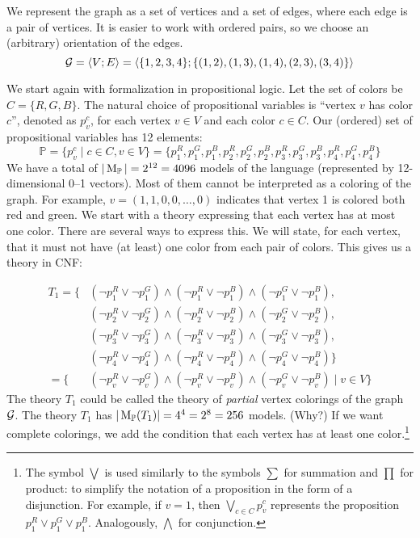 We represent the graph as a set of vertices and a set of edges, where each edge is a pair of vertices. It is easier to work with ordered pairs, so we choose an (arbitrary) orientation of the edges.
\[
\mathcal{G} = \langle V; E \rangle = \langle \{1,2,3,4\}; \{(1,2),(1,3),(1,4),(2,3),(3,4)\} \rangle
\]

We start again with formalization in propositional logic. Let the set of colors be \( C = \{R, G, B\} \). The natural choice of propositional variables is ``vertex \( v \) has color \( c \)'', denoted as \( p_v^c \), for each vertex \( v \in V \) and each color \( c \in C \). Our (ordered) set of propositional variables has 12 elements:
\[
\mathbb{P} = \{p_v^c \mid c \in C, v \in V\} = \{p_1^R, p_1^G, p_1^B, p_2^R, p_2^G, p_2^B, p_3^R, p_3^G, p_3^B, p_4^R, p_4^G, p_4^B\}
\]
We have a total of \( |\operatorname{M}_\mathbb{P}| = 2^{12} = 4096 \) models of the language (represented by 12-dimensional 0--1 vectors). Most of them cannot be interpreted as a coloring of the graph. For example, \( v = (1,1,0,0,\dots,0) \) indicates that vertex 1 is colored both red and green. We start with a theory expressing that each vertex has at most one color. There are several ways to express this. We will state, for each vertex, that it must not have (at least) one color from each pair of colors. This gives us a theory in {CNF}:

\begin{align*}
T_1 = \{ 
&(\neg p_1^R \lor \neg p_1^G) \land (\neg p_1^R \lor \neg p_1^B) \land (\neg p_1^G \lor \neg p_1^B),\\
&(\neg p_2^R \lor \neg p_2^G) \land (\neg p_2^R \lor \neg p_2^B) \land (\neg p_2^G \lor \neg p_2^B),\\
&(\neg p_3^R \lor \neg p_3^G) \land (\neg p_3^R \lor \neg p_3^B) \land (\neg p_3^G \lor \neg p_3^B),\\
&(\neg p_4^R \lor \neg p_4^G) \land (\neg p_4^R \lor \neg p_4^B) \land (\neg p_4^G \lor \neg p_4^B)\} \\
    = \{ &(\neg p_v^R \lor \neg p_v^G) \land (\neg p_v^R \lor \neg p_v^B) \land (\neg p_v^G \lor \neg p_v^B) \mid v \in V \} 
\end{align*}
The theory \(T_1\) could be called the theory of \emph{partial} vertex colorings of the graph \(\mathcal{G}\). The theory \(T_1\) has \(|\operatorname{M}_\mathbb{P}(T_1)| = 4^4 = 2^8 = 256\) models. (Why?) If we want complete colorings, we add the condition that each vertex has at least one color.\footnote{The symbol \(\bigvee \) is used similarly to the symbols \(\sum \) for summation and \(\prod \) for product: to simplify the notation of a proposition in the form of a disjunction. For example, if \(v = 1\), then \( \bigvee_{c \in C} p_v^c \) represents the proposition \( p_1^R \lor p_1^G \lor p_1^B \). Analogously, \(\bigwedge \) for conjunction.}

